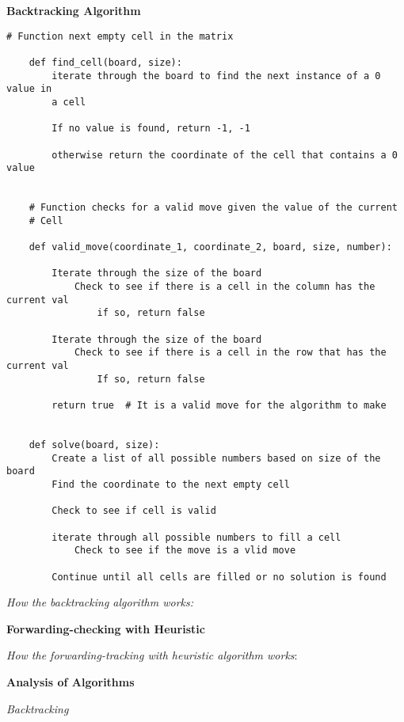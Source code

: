\documentclass{article}
\begin{document}
\pagebreak

\noindent \textbf{Backtracking Algorithm}

\begin{lstlisting}[frame=single]
	# Function next empty cell in the matrix
	
	def find_cell(board, size):
		iterate through the board to find the next instance of a 0 value in
		a cell
	
		If no value is found, return -1, -1
	
		otherwise return the coordinate of the cell that contains a 0 value	
	
	
	# Function checks for a valid move given the value of the current
	# Cell
	
	def valid_move(coordinate_1, coordinate_2, board, size, number):
	
		Iterate through the size of the board
			Check to see if there is a cell in the column has the current val
				if so, return false
	
		Iterate through the size of the board
			Check to see if there is a cell in the row that has the current val
				If so, return false
	
		return true  # It is a valid move for the algorithm to make
	
	
	def solve(board, size):
		Create a list of all possible numbers based on size of the board
		Find the coordinate to the next empty cell
		
		Check to see if cell is valid
	
		iterate through all possible numbers to fill a cell
			Check to see if the move is a vlid move
		
		Continue until all cells are filled or no solution is found
\end{lstlisting}

\textit{How the backtracking algorithm works:} \\

\pagebreak

\noindent \textbf{Forwarding-checking with Heuristic}


\textit{How the forwarding-tracking with heuristic algorithm works}: \\


\pagebreak

\noindent \textbf{Analysis of Algorithms}



\noindent \textit{Backtracking}

\bigskip
\end{document}

